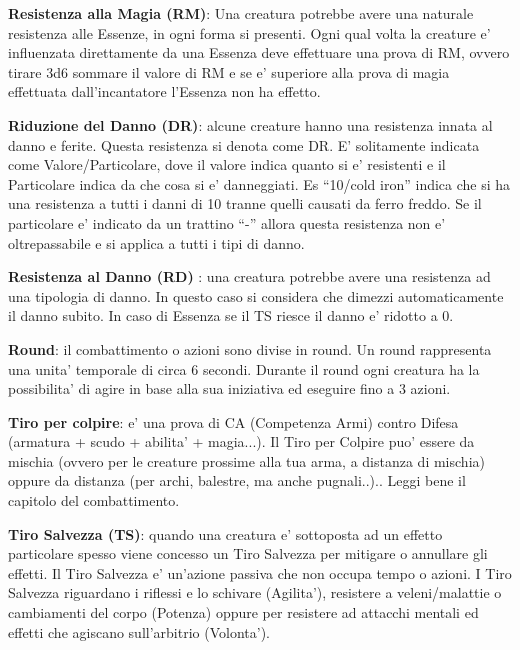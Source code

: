 \documentclass[a4paper,11pt,twoside,openany]{dndbook}
\begin{document}
\textbf{Resistenza alla Magia (RM)}: Una creatura potrebbe avere una naturale resistenza alle Essenze, in ogni forma si presenti. Ogni qual volta la creature e' influenzata direttamente da una Essenza deve effettuare una prova di RM, ovvero tirare 3d6 sommare il valore di RM e se e' superiore alla prova di magia effettuata dall'incantatore l'Essenza non ha effetto.

\textbf{Riduzione del Danno (DR)}:   alcune creature hanno una resistenza innata al danno e ferite. Questa resistenza si denota come DR.
E’ solitamente indicata come Valore/Particolare, dove il valore indica quanto si e’ resistenti e il Particolare indica da che cosa si e’ danneggiati. Es “10/cold iron” indica che si ha una resistenza a tutti i danni di 10 tranne quelli causati da ferro freddo.
Se il particolare e’ indicato da un trattino “-” allora questa resistenza non e’ oltrepassabile e si applica a tutti i tipi di danno.

\textbf{Resistenza al Danno (RD)}  : una creatura potrebbe avere una resistenza ad una tipologia di danno. In questo caso si considera che dimezzi automaticamente il danno subito.
In caso di Essenza se il TS riesce il danno e' ridotto a 0.

\textbf{Round}: il combattimento o azioni sono divise in round. Un round rappresenta una unita' temporale di circa 6 secondi. Durante il round ogni creatura ha la possibilita' di agire in base alla sua iniziativa ed eseguire fino a 3 azioni.

\textbf{Tiro per colpire}: e' una prova di CA (Competenza Armi) contro Difesa (armatura + scudo + abilita' + magia...). Il Tiro per Colpire puo' essere da mischia (ovvero per le creature prossime alla tua arma, a distanza di mischia) oppure da distanza (per archi, balestre, ma anche pugnali..).. Leggi bene il capitolo del combattimento.

\textbf{Tiro Salvezza (TS)}: quando una creatura e' sottoposta ad un effetto particolare spesso viene concesso un Tiro Salvezza per mitigare o annullare gli effetti. Il Tiro Salvezza e' un'azione passiva che non occupa tempo o azioni. 
I Tiro Salvezza riguardano i riflessi e lo schivare (Agilita'), resistere a veleni/malattie o cambiamenti del corpo (Potenza) oppure per resistere ad attacchi mentali ed effetti che agiscano sull'arbitrio (Volonta').
\end{document}
